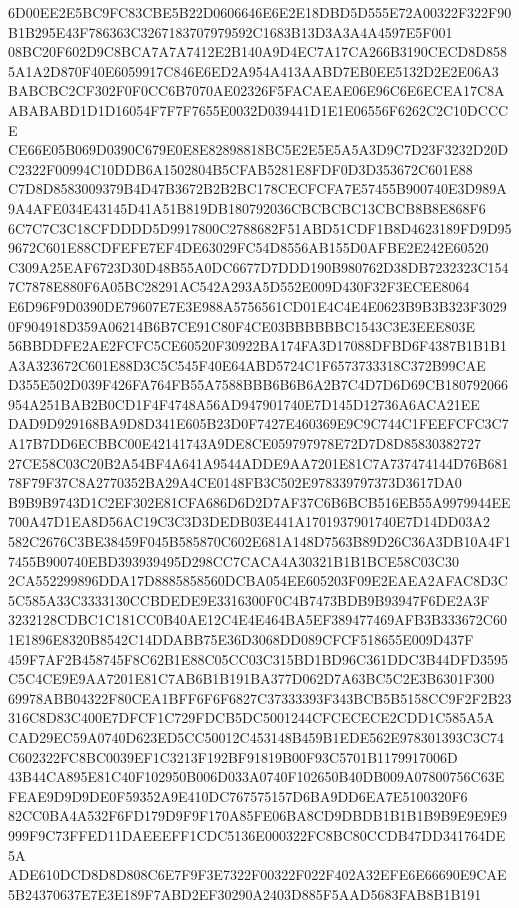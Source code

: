 \documentclass[UTF8,fontset=fandol,zihao=-4,a4paper]{ctexart}
\begin{document}
{{6D00EE2E5BC9FC83CBE5B22D0606646E6E2E18DBD5D555E72A00322F322F90B1B295E43F786363C3267183707979592C1683B13D3A3A4A4597E5F001
08BC20F602D9C8BCA7A7A7412E2B140A9D4EC7A17CA266B3190CECD8D8585A1A2D870F40E6059917C846E6ED2A954A413AABD7EB0EE5132D2E2E06A3
BABCBC2CF302F0F0CC6B7070AE02326F5FACAEAE06E96C6E6ECEA17C8AABABABD1D1D16054F7F7F7655E0032D039441D1E1E06556F6262C2C10DCCCE
CE66E05B069D0390C679E0E8E82898818BC5E2E5E5A5A3D9C7D23F3232D20DC2322F00994C10DDB6A1502804B5CFAB5281E8FDF0D3D353672C601E88
C7D8D8583009379B4D47B3672B2B2BC178CECFCFA7E57455B900740E3D989A9A4AFE034E43145D41A51B819DB180792036CBCBCBC13CBCB8B8E868F6
6C7C7C3C18CFDDDD5D9917800C2788682F51ABD51CDF1B8D4623189FD9D959672C601E88CDFEFE7EF4DE63029FC54D8556AB155D0AFBE2E242E60520
C309A25EAF6723D30D48B55A0DC6677D7DDD190B980762D38DB7232323C1547C7878E880F6A05BC28291AC542A293A5D552E009D430F32F3ECEE8064
E6D96F9D0390DE79607E7E3E988A5756561CD01E4C4E4E0623B9B3B323F30290F904918D359A06214B6B7CE91C80F4CE03BBBBBBC1543C3E3EEE803E
56BBDDFE2AE2FCFC5CE60520F30922BA174FA3D17088DFBD6F4387B1B1B1A3A323672C601E88D3C5C545F40E64ABD5724C1F6573733318C372B99CAE
D355E502D039F426FA764FB55A7588BBB6B6B6A2B7C4D7D6D69CB180792066954A251BAB2B0CD1F4F4748A56AD947901740E7D145D12736A6ACA21EE
DAD9D929168BA9D8D341E605B23D0F7427E460369E9C9C744C1FEEFCFC3C7A17B7DD6ECBBC00E42141743A9DE8CE059797978E72D7D8D85830382727
27CE58C03C20B2A54BF4A641A9544ADDE9AA7201E81C7A737474144D76B68178F79F37C8A2770352BA29A4CE0148FB3C502E978339797373D3617DA0
B9B9B9743D1C2EF302E81CFA686D6D2D7AF37C6B6BCB516EB55A9979944EE700A47D1EA8D56AC19C3C3D3DEDB03E441A1701937901740E7D14DD03A2
582C2676C3BE38459F045B585870C602E681A148D7563B89D26C36A3DB10A4F17455B900740EBD393939495D298CC7CACA4A30321B1B1BCE58C03C30
2CA552299896DDA17D8885858560DCBA054EE605203F09E2EAEA2AFAC8D3C5C585A33C3333130CCBDEDE9E3316300F0C4B7473BDB9B93947F6DE2A3F
3232128CDBC1C181CC0B40AE12C4E4E464BA5EF389477469AFB3B333672C601E1896E8320B8542C14DDABB75E36D3068DD089CFCF518655E009D437F
459F7AF2B458745F8C62B1E88C05CC03C315BD1BD96C361DDC3B44DFD3595C5C4CE9E9AA7201E81C7AB6B1B191BA377D062D7A63BC5C2E3B6301F300
69978ABB04322F80CEA1BFF6F6F6827C37333393F343BCB5B5158CC9F2F2B23316C8D83C400E7DFCF1C729FDCB5DC5001244CFCECECE2CDD1C585A5A
CAD29EC59A0740D623ED5CC50012C453148B459B1EDE562E978301393C3C74C602322FC8BC0039EF1C3213F192BF91819B00F93C5701B1179917006D
43B44CA895E81C40F102950B006D033A0740F102650B40DB009A07800756C63EFEAE9D9D9DE0F59352A9E410DC767575157D6BA9DD6EA7E5100320F6
82CC0BA4A532F6FD179D9F9F170A85FE06BA8CD9DBDB1B1B1B9B9E9E9E9999F9C73FFED11DAEEEFF1CDC5136E000322FC8BC80CCDB47DD341764DE5A
ADE610DCD8D8D808C6E7F9F3E7322F00322F022F402A32EFE6E66690E9CAE5B24370637E7E3E189F7ABD2EF30290A2403D885F5AAD5683FAB8B1B191
}}
\end{document}

